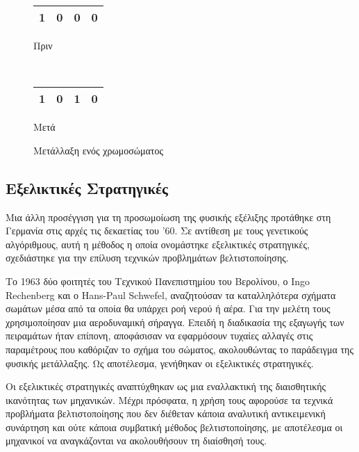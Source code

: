 \begin{figure}[!t]
    \centering
    \begin{subtable}[b]{.4\linewidth}
        \centering
        \begin{tabular}{|c|c|c|c|}
            \hline
            1 & 0 & \cellcolor{gray!25}0 & 0\\
            \hline
        \end{tabular}
        \caption{Πριν}
        \label{fig_beforeMutation}
    \end{subtable}
    ~
    \begin{subtable}[b]{.3\linewidth}
        \centering
        \begin{tabular}{|c|c|c|c|}
            \hline
            1 & 0 & \cellcolor{gray!25}1 & 0\\
            \hline
        \end{tabular}
        \caption{Μετά}
        \label{fig_afterMutation}
    \end{subtable}
    \caption{Μετάλλαξη ενός χρωμοσώματος}
    \label{fig_mutation}
\end{figure}

\subsection{Εξελικτικές Στρατηγικές}
Μια άλλη προσέγγιση για τη προσωμοίωση της φυσικής εξέλιξης προτάθηκε στη Γερμανία στις αρχές τις δεκαετίας του '60. Σε αντίθεση με τους γενετικούς αλγόριθμους, αυτή η μέθοδος η οποία ονομάστηκε εξελικτικές στρατηγικές, σχεδιάστηκε για την επίλυση τεχνικών προβλημάτων βελτιστοποίησης.

Το 1963 δύο φοιτητές του Τεχνικού Πανεπιστημίου του Βερολίνου, ο Ingo Rechenberg και ο Hans-Paul Schwefel, αναζητούσαν τα καταλληλότερα σχήματα σωμάτων μέσα από τα οποία θα υπάρχει ροή νερού ή αέρα. Για την μελέτη τους χρησιμοποίησαν μια αεροδυναμική σήραγγα. Επειδή η διαδικασία της εξαγωγής των πειραμάτων ήταν επίπονη, αποφάσισαν να εφαρμόσουν τυχαίες αλλαγές στις παραμέτρους που καθόριζαν το σχήμα του σώματος, ακολουθώντας το παράδειγμα της φυσικής μετάλλαξης. Ως αποτέλεσμα, γενήθηκαν οι εξελικτικές στρατηγικές.

Οι εξελικτικές στρατηγικές αναπτύχθηκαν ως μια εναλλακτική της διαισθητικής ικανότητας των μηχανικών. Μέχρι πρόσφατα, η χρήση τους αφορούσε τα τεχνικά προβλήματα βελτιστοποίησης που δεν διέθεταν κάποια αναλυτική αντικειμενική συνάρτηση και ούτε κάποια συμβατική μέθοδος βελτιστοποίησης, με αποτέλεσμα οι μηχανικοί να αναγκάζονται να ακολουθήσουν τη διαίσθησή τους.

